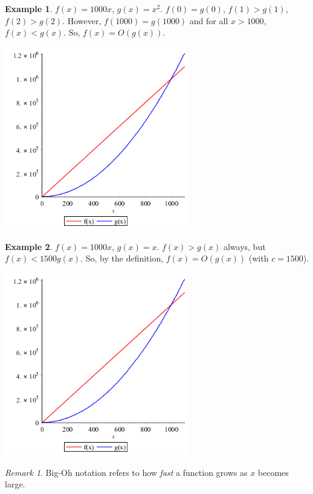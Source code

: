 \documentclass[12pt]{article}
\numberwithin{equation}{section}
\theoremstyle{theorem}
\theoremstyle{definition}
\newtheorem{example}{Example}[section]
\theoremstyle{remark}
\newtheorem*{remark}{Remark}
\begin{document}
\begin{example} $f(x) = 1000x$, $g(x) = x^2$.  $f(0) = g(0)$, $f(1) > g(1)$, $f(2) > g(2)$.  However, $f(1000) = g(1000)$ and for all $x > 1000$, $f(x) < g(x)$.  So, $f(x) = O(g(x))$. 
\begin{center}
\includegraphics[width=8cm, height=8cm]{./Images/Asymptotic-1.png}
\end{center}
\end{example}

\begin{example} $f(x) = 1000x$, $g(x) = x$.  $f(x) > g(x)$ always, but $f(x) < 1500g(x)$.  So, by the definition, $f(x) = O(g(x))$ (with $c = 1500$).
\begin{center}
\includegraphics[width=8cm, height=8cm]{./Images/Asymptotic-1.png}
\end{center}
\end{example}

\begin{remark} Big-Oh notation refers to how \textit{fast} a function grows as $x$ becomes large.  \end{remark}
\end{document}
